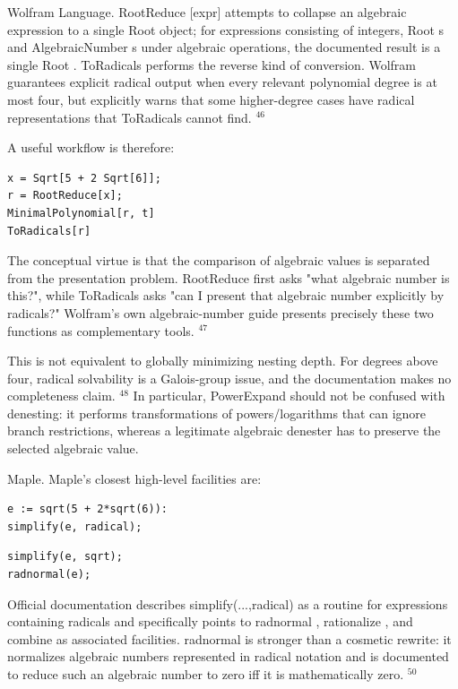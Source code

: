 \documentclass[10pt]{article}
\begin{document}
Wolfram Language. RootReduce [expr] attempts to collapse an algebraic expression to a single Root object; for expressions consisting of integers, Root s and AlgebraicNumber s under algebraic operations, the documented result is a single Root . ToRadicals performs the reverse kind of conversion. Wolfram guarantees explicit radical output when every relevant polynomial degree is at most four, but explicitly warns that some higher-degree cases have radical representations that ToRadicals cannot find. ${ }^{46}$

A useful workflow is therefore:

\begin{verbatim}
x = Sqrt[5 + 2 Sqrt[6]];
r = RootReduce[x];
MinimalPolynomial[r, t]
ToRadicals[r]
\end{verbatim}

The conceptual virtue is that the comparison of algebraic values is separated from the presentation problem. RootReduce first asks "what algebraic number is this?", while ToRadicals asks "can I present that algebraic number explicitly by radicals?" Wolfram's own algebraic-number guide presents precisely these two functions as complementary tools. ${ }^{47}$

This is not equivalent to globally minimizing nesting depth. For degrees above four, radical solvability is a Galois-group issue, and the documentation makes no completeness claim. ${ }^{48}$ In particular, PowerExpand should not be confused with denesting: it performs transformations of powers/logarithms that can ignore branch restrictions, whereas a legitimate algebraic denester has to preserve the selected algebraic value.

Maple. Maple's closest high-level facilities are:

\begin{verbatim}
e := sqrt(5 + 2*sqrt(6)):
simplify(e, radical);
\end{verbatim}

\begin{verbatim}
simplify(e, sqrt);
radnormal(e);
\end{verbatim}

Official documentation describes simplify(...,radical) as a routine for expressions containing radicals and specifically points to radnormal , rationalize , and combine as associated facilities. radnormal is stronger than a cosmetic rewrite: it normalizes algebraic numbers represented in radical notation and is documented to reduce such an algebraic number to zero iff it is mathematically zero. ${ }^{50}$
\end{document}

